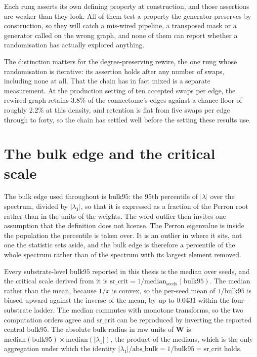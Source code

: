 Each rung asserts its own defining property at construction, and those
assertions are weaker than they look. All of them test a property the generator
preserves by construction, %
so they will catch a mis-wired pipeline, a transposed mask or a generator called
on the wrong graph, and none of them can report whether a randomisation has
actually explored anything.

The distinction matters for the degree-preserving rewire, the one rung whose
randomisation is iterative: its assertion holds after any number of swaps,
including none at all. That the chain has in fact mixed is a separate
measurement. At the production setting of ten accepted swaps per edge, the
rewired graph retains 3.8\% %
of the connectome's edges against a chance floor of roughly
2.2\% %
at this density, and retention is flat from five swaps per edge through to
forty, %
so the chain has settled well before the setting these results use.



\section{The bulk edge and the critical scale}
\label{sec:methods-bulk95}
\bigskip

The bulk edge used throughout is $\mathrm{bulk95}$: the 95th percentile of
$|\lambda|$ over the spectrum, divided by $|\lambda_1|$, so that it is expressed
as a fraction of the Perron root rather than in the units of the
weights. %
The word outlier then invites one assumption that the definition does not
license. The Perron eigenvalue is inside the population the percentile is taken
over. %
It is an outlier in where it sits, not one the statistic sets aside, and the
bulk edge is therefore a percentile of the whole spectrum rather than of the
spectrum with its largest element removed.

Every substrate-level $\mathrm{bulk95}$ reported in this thesis is the median
over seeds, and the critical scale derived from it is
$\mathrm{sr\_crit} = 1 / \mathrm{median}_{\text{seeds}}(\mathrm{bulk95})$. %
The median rather than the mean, because $1/x$ is convex, so the per-seed mean
of $1/\mathrm{bulk95}$ is biased upward against the inverse of the mean, by up
to 0.0431 %
within the four-substrate ladder. The median commutes with monotone transforms,
so the two computation orders agree and $\mathrm{sr\_crit}$ can be reproduced by
inverting the reported central $\mathrm{bulk95}$. %
The absolute bulk radius in raw units of $\mathbf{W}$ is
$\mathrm{median}(\mathrm{bulk95}) \times \mathrm{median}(|\lambda_1|)$, the
product of the medians, which is the only aggregation under which the identity
$|\lambda_1| / \mathrm{abs\_bulk} = 1/\mathrm{bulk95} = \mathrm{sr\_crit}$
holds. %




